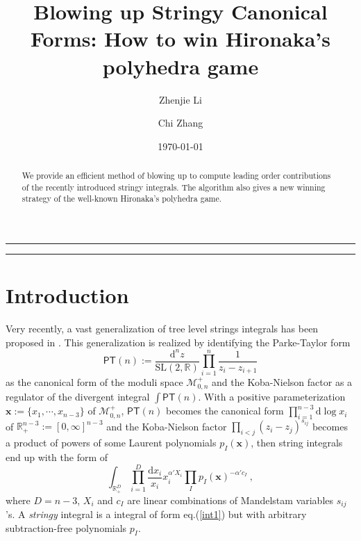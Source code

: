 \documentclass[12pt]{article}
\date{\today}
\title{Blowing up Stringy Canonical Forms: How to win Hironaka's polyhedra game}
\author{Zhenjie Li\and Chi Zhang}
\theoremstyle{definition}
\theoremstyle{plain}
\newcommand{\dif}{\mathrm{d}} %
\begin{document}
\maketitle

\begin{abstract}
We provide an efficient method of blowing up to compute leading order contributions of the recently introduced stringy integrals. 
The algorithm also gives a new winning strategy of the well-known Hironaka's polyhedra game.
\end{abstract}
\newpage

\begin{center}
	\rule{1.0\textwidth}{1pt}
\end{center}
\tableofcontents

\bigskip
\begin{center}
	\rule{1.0\textwidth}{1pt}
\end{center}


\section{Introduction}


Very recently, a vast generalization of tree level strings integrals has been proposed in \cite{Arkani-Hamed:2019mrd}. This generalization is realized by identifying the Parke-Taylor form 
\[
	\mathsf{PT}(n):=\frac{\dif^{n}z}{\mathrm{SL}(2,\mathbb{R})} \prod_{i=1}^{n}\frac{1}{z_{i}-z_{i+1}}
\]
as the canonical form of the moduli space $\mathcal{M}_{0,n}^{+}$ and the Koba-Nielson factor as a regulator of the divergent integral $\int \mathsf{PT}(n)$. With a positive parameterization  $\mathbf{x}:= \{x_{1},\cdots, x_{n-3}\}$  of $\mathcal{M}_{0,n}^{+}$, $\mathsf{PT}(n)$ becomes the canonical form $\prod_{i=1}^{n-3} \dif \log x_{i}$ of $\mathbb{R}_{+}^{n-3}:=[0,\infty]^{n-3}$ and the Koba-Nielson factor $\prod_{i<j} (z_{i}-z_{j})^{s_{ij}}$ becomes a product of powers of some Laurent polynomials $p_{I}(\mathbf{x})$, then string integrals end up with the form of
\begin{equation} 
	\int_{\mathbb{R}_{+}^{D}} \prod_{i=1}^{D}\frac{\dif x_{i}}{x_{i}}x_{i}^{\alpha' X_{i}}\prod_{I}p_{I}(\mathbf{x})^{-\alpha'c_{I}}	\:, \label{int1}
\end{equation}
where $D=n{-}3$, $X_{i}$ and $c_{I}$ are linear combinations of Mandelstam variables $s_{ij}$'s. A \emph{stringy} integral is a integral of form eq.(\ref{int1}) but with arbitrary subtraction-free polynomials $p_{I}$. 
\end{document}
